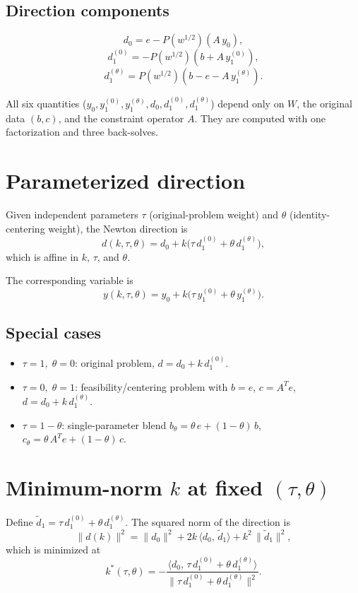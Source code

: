 \documentclass{article}
\newcommand{\PW}{P(w^{1/2})}
\begin{document}
\subsection{Direction components}

\[
  d_0 = e - \PW(A\,y_0),
\]
\[
  d_1^{(0)} = -\PW(b + A\,y_1^{(0)}),
\]
\[
  d_1^{(\theta)} = \PW(b - e - A\,y_1^{(\theta)}).
\]

All six quantities ($y_0, y_1^{(0)}, y_1^{(\theta)}, d_0, d_1^{(0)},
d_1^{(\theta)}$) depend only on $W$, the original data $(b, c)$, and
the constraint operator $A$.  They are computed with one factorization
and three back-solves.

\section{Parameterized direction}

Given independent parameters $\tau$ (original-problem weight) and
$\theta$ (identity-centering weight), the Newton direction is
\[
  \boxed{d(k,\tau,\theta) = d_0 + k\bigl(\tau\,d_1^{(0)}
    + \theta\,d_1^{(\theta)}\bigr),}
\]
which is affine in $k$, $\tau$, and $\theta$.

The corresponding variable is
\[
  y(k,\tau,\theta) = y_0 + k\bigl(\tau\,y_1^{(0)}
    + \theta\,y_1^{(\theta)}\bigr).
\]

\subsection{Special cases}

\begin{itemize}
  \item $\tau = 1,\;\theta = 0$: original problem,
        $d = d_0 + k\,d_1^{(0)}$.
  \item $\tau = 0,\;\theta = 1$: feasibility/centering problem with
        $b = e$, $c = A^T e$, \; $d = d_0 + k\,d_1^{(\theta)}$.
  \item $\tau = 1-\theta$: single-parameter blend
        $b_\theta = \theta\,e + (1-\theta)\,b$, \;
        $c_\theta = \theta\,A^T e + (1-\theta)\,c$.
\end{itemize}

\section{Minimum-norm $k$ at fixed $(\tau,\theta)$}

Define $\tilde{d}_1 = \tau\,d_1^{(0)} + \theta\,d_1^{(\theta)}$.
The squared norm of the direction is
\[
  \|d(k)\|^2 = \|d_0\|^2 + 2k\,\langle d_0,\,\tilde{d}_1\rangle
               + k^2\,\|\tilde{d}_1\|^2,
\]
which is minimized at
\[
  \boxed{k^*(\tau,\theta)
    = -\frac{\langle d_0,\, \tau\,d_1^{(0)}
             + \theta\,d_1^{(\theta)}\rangle}
            {\|\tau\,d_1^{(0)}
             + \theta\,d_1^{(\theta)}\|^2}.}
\]
\end{document}
